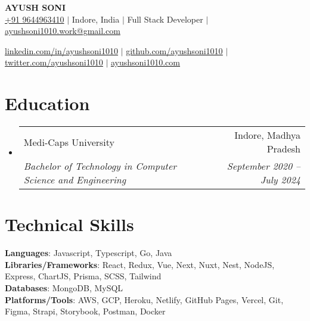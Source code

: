 \documentclass[letterpaper,11pt]{article}
\makeatletter
\newcommand{\resumeSubheading}[4]{
    \vspace{-2pt}\item
      \begin{tabular*}{0.97\textwidth}[t]{l@{\extracolsep{\fill}}r}
        {#1} & #2 \\
        \textit{\small#3} & \textit{\small #4} \\
      \end{tabular*}\vspace{-7pt}
  }
\newcommand{\resumeSubHeadingListStart}{\begin{itemize}[leftmargin=0.15in, label={}]}
\newcommand{\resumeSubHeadingListEnd}{\end{itemize}}
\makeatother
\begin{document}

\begin{center}
  \textbf{\Huge \scshape AYUSH SONI} \\ \vspace{1pt}
  \href{tel:9644963410}{+91 9644963410} $|$
  {Indore, India} $|$
  {Full Stack Developer} $|$
  \href{mailto:ayushsoni1010.work@gmail.com}{ayushsoni1010.work@gmail.com} \\ \vspace{1pt}

  \href{https://linkedin.com/in/ayushsoni1010}{\underline{linkedin.com/in/ayushsoni1010}} $|$
  \href{https://github.com/ayushsoni1010}{\underline{github.com/ayushsoni1010}} $|$
  \href{https://twitter.com/ayushsoni1010}{\underline{twitter.com/ayushsoni1010}} $|$
  \href{https://ayushsoni1010.com}{\underline{ayushsoni1010.com}}
\end{center}

\section{Education}
\resumeSubHeadingListStart
\resumeSubheading
{Medi-Caps University}{Indore, Madhya Pradesh}
{Bachelor of Technology in Computer Science and Engineering}{September 2020 -- July 2024}
\resumeSubHeadingListEnd


\section{Technical Skills}
\begin{itemize}[leftmargin=0.15in, label={}]
  \small{\item{
        \textbf{Languages}{: Javascript, Typescript, Go, Java } \\
        \textbf{Libraries/Frameworks}{: React, Redux, Vue, Next, Nuxt, Nest, NodeJS, Express, ChartJS, Prisma, SCSS, Tailwind} \\
        \textbf{Databases}{: MongoDB, MySQL} \\
        \textbf{Platforms/Tools}{: AWS, GCP, Heroku, Netlify, GitHub Pages, Vercel, Git, Figma, Strapi, Storybook, Postman, Docker } \\
        }}
\end{itemize}


\end{document}
